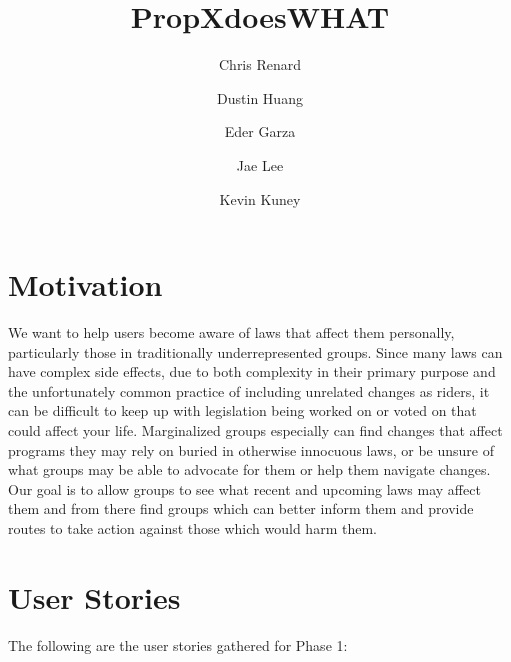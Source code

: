 \documentclass[12pt]{article}
\title{PropXdoesWHAT}
\author{Chris Renard \and Dustin Huang \and Eder Garza \and Jae Lee \and Kevin Kuney}
\date{} %
\begin{document}
\maketitle

\section{Motivation}

We want to help users become aware of laws that affect them personally, particularly those in traditionally underrepresented groups. 
Since many laws can have complex side effects, due to both complexity in their primary purpose and the unfortunately common practice of including unrelated changes as riders, it can be difficult to keep up with legislation being worked on or voted on that could affect your life.
Marginalized groups especially can find changes that affect programs they may rely on buried in otherwise innocuous laws, or be unsure of what groups may be able to advocate for them or help them navigate changes.
Our goal is to allow groups to see what recent and upcoming laws may affect them and from there find groups which can better inform them and provide routes to take action against those which would harm them.


\section{User Stories}

The following are the user stories gathered for Phase 1: \\
\end{document}
